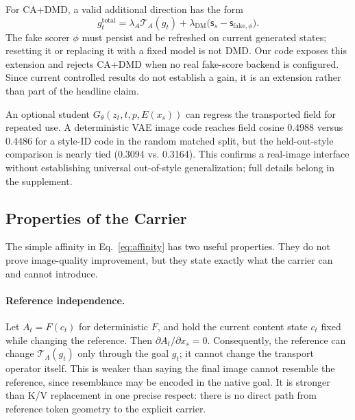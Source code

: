 \documentclass[10pt,letterpaper]{article}
\newcommand{\score}{\mathsf{s}}
\begin{document}
For CA+DMD, a valid additional direction has the form
\begin{equation}
 g_t^{\mathrm{total}}=\lambda_A\mathcal T_A(g_t)
 +\lambda_{\mathrm{DM}}\big(\score_s-\score_{\mathrm{fake},\phi}\big).
 \label{eq:dmdext}
\end{equation}
The fake scorer $\phi$ must persist and be refreshed on current generated
states; resetting it or replacing it with a fixed model is not DMD. Our code
exposes this extension and rejects CA+DMD when no real fake-score backend is
configured. Since current controlled results do not establish a gain, it is an
extension rather than part of the headline claim.

An optional student $G_\theta(z_t,t,p,E(x_s))$ can regress the transported
field for repeated use. A deterministic VAE image code reaches field cosine
0.4988 versus 0.4486 for a style-ID code in the random matched split, but the
held-out-style comparison is nearly tied (0.3094 vs. 0.3164). This confirms a
real-image interface without establishing universal out-of-style
generalization; full details belong in the supplement.

\subsection{Properties of the Carrier}

The simple affinity in Eq.~\ref{eq:affinity} has two useful properties. They do
not prove image-quality improvement, but they state exactly what the carrier
can and cannot introduce.

\paragraph{Reference independence.}
Let $A_t=F(c_t)$ for deterministic $F$, and hold the current content state
$c_t$ fixed while changing the reference. Then
$\partial A_t/\partial x_s=0$. Consequently, the reference can change
$\mathcal T_A(g_t)$ only through the goal $g_t$; it cannot change the transport
operator itself. This is weaker than saying the final image cannot resemble the
reference, since resemblance may be encoded in the native goal. It is stronger
than K/V replacement in one precise respect: there is no direct path from
reference token geometry to the explicit carrier.
\end{document}
